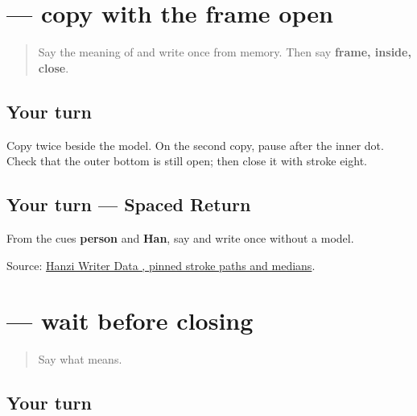 \section[\texorpdfstring{\zh{国} (guó)}{国 (guó)}]{ — copy with the frame open}

\label{lesson:ZH-W17-guo-guided}



\begin{quote}
Say the meaning of  and write \textbf{} once from memory. Then say \textbf{frame, inside, close}.
\end{quote}

\subsection*{Your turn}

Copy \textbf{} twice beside the model. On the second copy, pause after the inner dot. Check that the outer bottom is still open; then close it with stroke eight.

\subsection*{Your turn — Spaced Return}
From the cues \textbf{person} and \textbf{Han}, say  and write  once without a model.

\begin{tcolorbox}[breakable,colback=teal!4,colframe=teal!35!black,title={Before you move on}]
Source: \href{https://raw.githubusercontent.com/chanind/hanzi-writer-data/68d10a4b21150cae5e1ebbd223eed289cf32d90c/data/\%E5\%9B\%BD.json}{Hanzi Writer Data , pinned stroke paths and medians}.
\end{tcolorbox}
\section[\texorpdfstring{\zh{国} (guó)}{国 (guó)}]{ — wait before closing}

\label{lesson:ZH-W17-guo-delayed}



\begin{quote}
Say what  means.
\end{quote}

\subsection*{Your turn}

